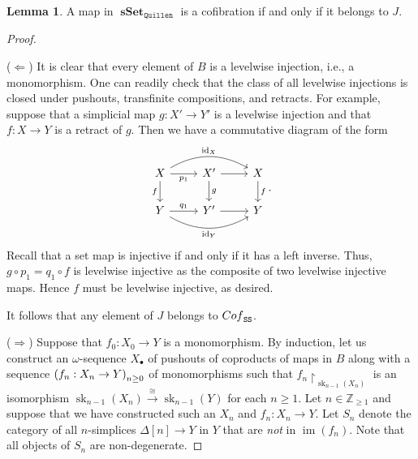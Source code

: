 \documentclass[10pt,letterpaper,cm]{nupset}
\theoremstyle{definition}
\theoremstyle{theorem}
\newtheorem{lemma}[definition]{Lemma}
\theoremstyle{remark}
\newcommand{\Z}{\mathbb Z}
\DeclareMathOperator{\im}{im}
\newcommand{\0}{\mathbf{0}}
\newcommand{\1}{\mathbf{1}}
\newcommand{\2}{\mathbf{2}}
\DeclareMathOperator{\sset}{\mathbf{sSet}}
\DeclareMathOperator{\sk}{sk}
\DeclareMathOperator{\idd}{id}
\DeclareMathOperator{\cof}{\mathnormal{Cof}}
\begin{document}
\begin{lemma}\label{cofJ}
A map in $\sset_{\mathtt{Quillen}}$ is a cofibration if and only if it belongs to $J$.
\end{lemma}
\begin{proof} $ $
\smallskip

($\Longleftarrow$) It is clear that every element of $B$ is a levelwise injection, i.e., a monomorphism. One can readily check that the class of all levelwise injections is closed under pushouts, transfinite compositions, and retracts. For example, suppose that a simplicial map $g : X' \to Y'$ is a levelwise injection and that $f: X \to Y$ is a retract of $g$. Then we have a commutative diagram of the form
\[
\begin{tikzcd}
X \arrow[d, "f"'] \arrow[r, "p_1"'] \arrow[rr, "\idd_X", bend left] & X' \arrow[d, "g"] \arrow[r] & X \arrow[d, "f"] \\
Y \arrow[r, "q_1"] \arrow[rr, "\idd_Y"', bend right]                & Y' \arrow[r]                 & Y               
\end{tikzcd}.
\] Recall that a set map is injective if and only if it has a left inverse. Thus, $g \circ p_1 = q_1 \circ f$ is levelwise injective as the composite of two levelwise injective maps.  Hence $f$ must be levelwise injective, as desired.

\smallskip

It follows that any element of $J$ belongs to $\cof_{\mathtt{SS}}$.

\medskip

($\Longrightarrow$) Suppose that $f_0 : X_0 \to Y$ is a monomorphism. By induction, let us construct an $\omega$-sequence $X_{\bullet}$ of pushouts of coproducts of maps in $B$ along with a sequence $\mleft(f_n : X_n \to Y\mright)_{n \geq 0}$ of monomorphisms such that  $f_n\restriction_{\sk_{n-1}(X_n)}$ is an isomorphism $\sk_{n-1}(X_n) \overset{\cong}{\longrightarrow} \sk_{n-1}(Y)$ for each $n\geq 1$. Let $n\in \Z_{\geq 1}$ and suppose that we have constructed such an $X_n$ and $f_n : X_n \to Y$.  Let $S_n$ denote the category of all $n$-simplices $\Delta[n] \to Y$ in $Y$ that are \emph{not} in $\im(f_n)$. Note that all objects of $S_n$ are non-degenerate.


\end{proof}
\end{document}
